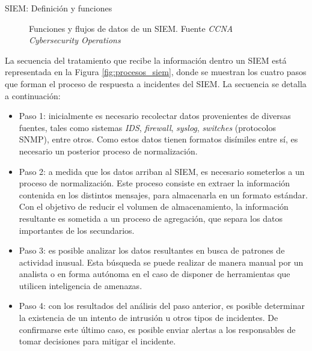 \begin{section}{SIEM: Definición y funciones}
\begin{figure}[H]
            \caption{Funciones y flujos de datos de un SIEM. Fuente \textit{CCNA Cybersecurity Operations} \cite{ccna}}
            \label{fig:flujo_datos_siem}
        \end{figure}
        \FloatBarrier
        La secuencia del tratamiento que recibe la información dentro un SIEM está representada en la Figura \ref{fig:procesos_siem}, donde se muestran los cuatro pasos que forman el proceso de respuesta a incidentes del SIEM. La secuencia se detalla a continuación:
        \begin{itemize}
            \item Paso 1: inicialmente es necesario recolectar datos provenientes de diversas fuentes, tales como sistemas \textit{IDS}, \textit{firewall}, \textit{syslog}, \textit{switches} (protocolos SNMP), entre otros. Como estos datos tienen formatos disímiles entre sí, es necesario un posterior proceso de normalización.
            \item Paso 2: a medida que los datos arriban al SIEM, es necesario someterlos a un proceso de normalización. Este proceso consiste en extraer la información contenida en los distintos mensajes, para almacenarla en un formato estándar. Con el objetivo de reducir el volumen de almacenamiento, la información resultante es sometida a un proceso de agregación, que separa los datos importantes de los secundarios.
            \item Paso 3: es posible analizar los datos resultantes en busca de patrones de actividad inusual. Esta búsqueda se puede realizar de manera manual por un analista o en forma autónoma en el caso de disponer de herramientas  que utilicen inteligencia de amenazas.
            \item Paso 4:  con los resultados del análisis del paso anterior, es posible determinar la existencia de un intento de intrusión u otros tipos de incidentes. De confirmarse este último caso, es posible enviar alertas a los responsables de tomar decisiones para mitigar el incidente.
        \end{itemize}
    \begin{figure}[H]
            \centering

\end{figure}
\end{section}
